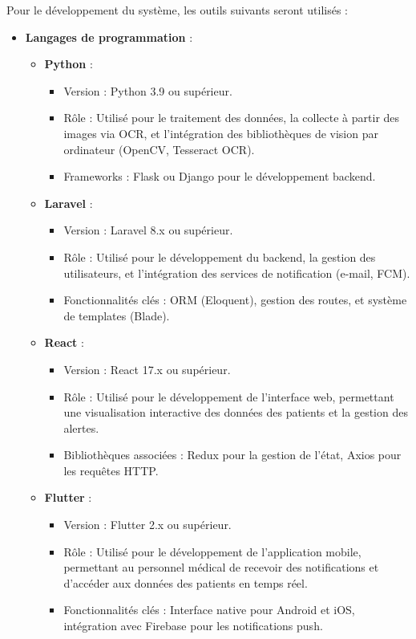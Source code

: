 Pour le développement du système, les outils suivants seront utilisés :

\begin{itemize}
    \item \textbf{Langages de programmation} :
    \begin{itemize}
        \item \textbf{Python} :
            \begin{itemize}
                \item Version : Python 3.9 ou supérieur.
                \item Rôle : Utilisé pour le traitement des données, la collecte à partir des images via OCR, et l'intégration des bibliothèques de vision par ordinateur (OpenCV, Tesseract OCR).
                \item Frameworks : Flask ou Django pour le développement backend.
            \end{itemize}
        \item \textbf{Laravel} :
            \begin{itemize}
                \item Version : Laravel 8.x ou supérieur.
                \item Rôle : Utilisé pour le développement du backend, la gestion des utilisateurs, et l'intégration des services de notification (e-mail, FCM).
                \item Fonctionnalités clés : ORM (Eloquent), gestion des routes, et système de templates (Blade).
            \end{itemize}
        \item \textbf{React} :
            \begin{itemize}
                \item Version : React 17.x ou supérieur.
                \item Rôle : Utilisé pour le développement de l'interface web, permettant une visualisation interactive des données des patients et la gestion des alertes.
                \item Bibliothèques associées : Redux pour la gestion de l'état, Axios pour les requêtes HTTP.
            \end{itemize}
        \item \textbf{Flutter} :
            \begin{itemize}
                \item Version : Flutter 2.x ou supérieur.
                \item Rôle : Utilisé pour le développement de l'application mobile, permettant au personnel médical de recevoir des notifications et d'accéder aux données des patients en temps réel.
                \item Fonctionnalités clés : Interface native pour Android et iOS, intégration avec Firebase pour les notifications push.
            \end{itemize}
    \end{itemize}


\end{itemize}
